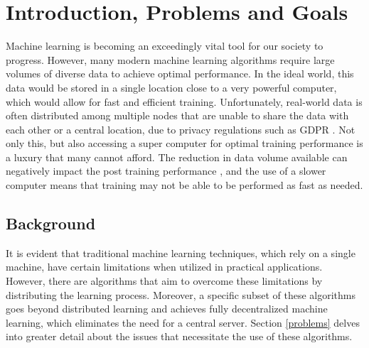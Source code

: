 \chapter{Introduction, Problems and Goals}
Machine learning is becoming an exceedingly vital tool for our society to progress. However, many modern machine learning algorithms require large volumes of diverse data to achieve optimal performance. In the ideal world, this data would be stored in a single location close to a very powerful computer, which would allow for fast and efficient training. Unfortunately, real-world data is often distributed among multiple nodes that are unable to share the data with each other or a central location, due to privacy regulations such as GDPR \cite{gdpr}. Not only this, but also accessing a super computer for optimal training performance is a luxury that many cannot afford. The reduction in data volume available can negatively impact the post training performance \cite{data_volume}, and the use of a slower computer means that training may not be able to be performed as fast as needed.

\section{Background}
It is evident that traditional machine learning techniques, which rely on a single machine, have certain limitations when utilized in practical applications. However, there are algorithms that aim to overcome these limitations by distributing the learning process. Moreover, a specific subset of these algorithms goes beyond distributed learning and achieves fully decentralized machine learning, which eliminates the need for a central server. Section \ref{problems} delves into greater detail about the issues that necessitate the use of these algorithms.

